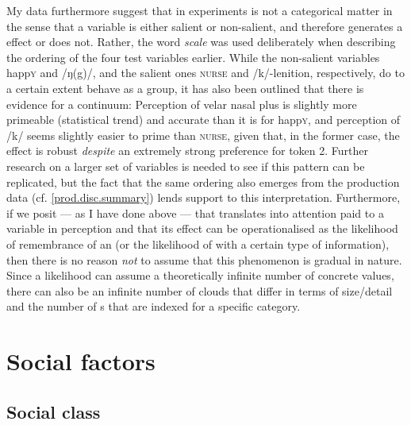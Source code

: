 My data furthermore suggest that  in   experiments is not a categorical matter in the sense that a variable is either salient or non-salient, and therefore generates a  effect or does not.
Rather, the word \emph{scale} was used deliberately when describing the ordering of the four test variables earlier.
While the non-salient variables happ\textsc{y} and /ŋ(g)/, and the salient ones \textsc{nurse} and /k/-lenition, respectively, do to a certain extent behave as a group, it has also been outlined that there is evidence for a continuum: Perception of velar nasal plus is slightly more primeable (statistical trend) and accurate than it is for happ\textsc{y}, and perception of /k/ seems slightly easier to prime than \textsc{nurse}, given that, in the former case, the effect is robust \emph{despite} an extremely strong preference for token 2.
Further research on a larger set of variables is needed to see if this pattern can be replicated, but the fact that the same ordering also emerges from the production data (cf. \ref{prod.disc.summary}) lends support to this interpretation.
Furthermore, if we posit --- as I have done above --- that  translates into attention paid to a variable in perception and that its effect can be operationalised as the likelihood of remembrance of an  (or the likelihood of  with a certain type of information), then there is no reason \emph{not} to assume that this phenomenon is gradual in nature.
Since a likelihood can assume a theoretically infinite number of concrete values, there can also be an infinite number of  clouds that differ in terms of size/detail and the number of s that are indexed for a specific category.

	\section{Social factors}
		\label{sec.perc_res.disc.social}

		\subsection{Social class}

